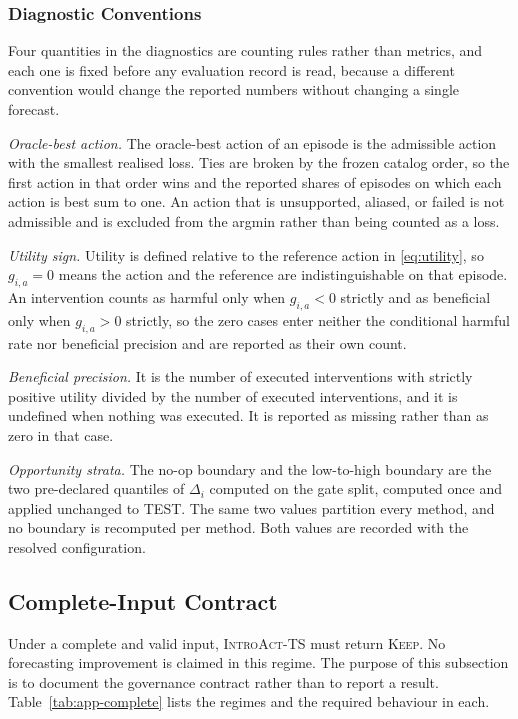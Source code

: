 \documentclass{article}
\newcommand{\introact}{\textsc{IntroAct-TS}}
\begin{document}
\subsubsection{Diagnostic Conventions}
\label{app:diagnostic-conventions}
Four quantities in the diagnostics are counting rules rather than metrics, and each one is
fixed before any evaluation record is read, because a different convention would change the
reported numbers without changing a single forecast.

\emph{Oracle-best action.} The oracle-best action of an episode is the admissible action with
the smallest realised loss. Ties are broken by the frozen catalog order, so the first action in
that order wins and the reported shares of episodes on which each action is best sum to one. An
action that is unsupported, aliased, or failed is not admissible and is excluded from the
argmin rather than being counted as a loss.

\emph{Utility sign.} Utility is defined relative to the reference action in
\eqref{eq:utility}, so $g_{i,a} = 0$ means the action and the reference are indistinguishable on
that episode. An intervention counts as harmful only when $g_{i,a} < 0$ strictly and as
beneficial only when $g_{i,a} > 0$ strictly, so the zero cases enter neither the conditional
harmful rate nor beneficial precision and are reported as their own count.

\emph{Beneficial precision.} It is the number of executed interventions with strictly positive
utility divided by the number of executed interventions, and it is undefined when nothing was
executed. It is reported as missing rather than as zero in that case.

\emph{Opportunity strata.} The no-op boundary and the low-to-high boundary are the two
pre-declared quantiles of $\Delta_i$ computed on the gate split, computed once and applied
unchanged to TEST. The same two values partition every method, and no boundary is recomputed
per method. Both values are recorded with the resolved configuration.

\subsection{Complete-Input Contract}
\label{app:contract}
Under a complete and valid input, \introact{} must return \textsc{Keep}. No forecasting
improvement is claimed in this regime. The purpose of this subsection is to document the
governance contract rather than to report a result. Table~\ref{tab:app-complete} lists the
regimes and the required behaviour in each.
\end{document}
